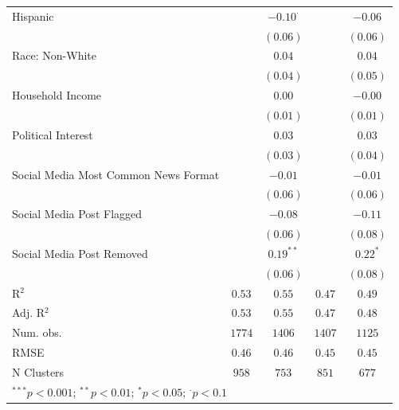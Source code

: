 \begin{table}[!htpb]
\begin{center}
{\begin{tabular}{l c c c c}
Hispanic                             &              & $-0.10^{\cdot}$ &              & $-0.06$     \\
                                     &              & $(0.06)$        &              & $(0.06)$    \\
Race: Non-White                      &              & $0.04$          &              & $0.04$      \\
                                     &              & $(0.04)$        &              & $(0.05)$    \\
Household Income                     &              & $0.00$          &              & $-0.00$     \\
                                     &              & $(0.01)$        &              & $(0.01)$    \\
Political Interest                   &              & $0.03$          &              & $0.03$      \\
                                     &              & $(0.03)$        &              & $(0.04)$    \\
Social Media Most Common News Format &              & $-0.01$         &              & $-0.01$     \\
                                     &              & $(0.06)$        &              & $(0.06)$    \\
Social Media Post Flagged            &              & $-0.08$         &              & $-0.11$     \\
                                     &              & $(0.06)$        &              & $(0.08)$    \\
Social Media Post Removed            &              & $0.19^{**}$     &              & $0.22^{*}$  \\
                                     &              & $(0.06)$        &              & $(0.08)$    \\
\hline
R$^2$                                & $0.53$       & $0.55$          & $0.47$       & $0.49$      \\
Adj. R$^2$                           & $0.53$       & $0.55$          & $0.47$       & $0.48$      \\
Num. obs.                            & $1774$       & $1406$          & $1407$       & $1125$      \\
RMSE                                 & $0.46$       & $0.46$          & $0.45$       & $0.45$      \\
N Clusters                           & $958$        & $753$           & $851$        & $677$       \\
\hline
\multicolumn{5}{l}{\scriptsize{$^{***}p<0.001$; $^{**}p<0.01$; $^{*}p<0.05$; $^{\cdot}p<0.1$}}
\end{tabular}
}
\label{tab:mainmodel-mainspecification-censorship-weighted-clusteredses-ld}
\end{center}
\end{table}
